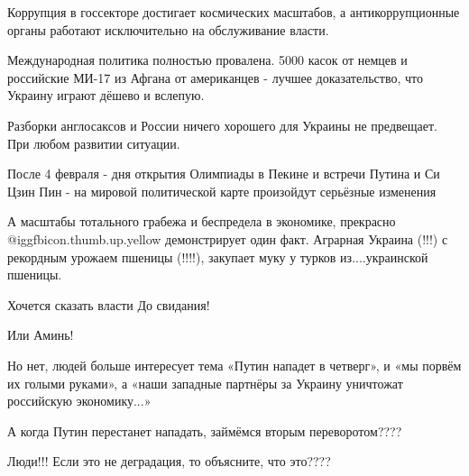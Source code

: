 Коррупция в госсекторе достигает космических масштабов, а антикоррупционные
органы работают исключительно на обслуживание власти. 

Международная политика полностью провалена. 5000 касок от немцев и российские
МИ-17 из Афгана от американцев - лучшее доказательство, что Украину играют
дёшево и вслепую. 

Разборки англосаксов и России ничего хорошего для Украины не предвещает. При
любом развитии ситуации. 

После 4 февраля - дня открытия Олимпиады в Пекине и встречи Путина и Си Цзин
Пин - на мировой политической карте произойдут серьёзные изменения 

А масштабы тотального грабежа и беспредела в экономике, прекрасно  @igg{fbicon.thumb.up.yellow} 
демонстрирует один факт. Аграрная Украина (!!!) с рекордным урожаем пшеницы
(!!!!), закупает муку у турков из....украинской пшеницы. 

Хочется сказать власти До свидания! 

Или Аминь! 

Но нет, людей больше интересует тема «Путин нападет в четверг», и «мы порвём их
голыми руками», а «наши западные партнёры за Украину уничтожат российскую
экономику...»

А когда Путин перестанет нападать, займёмся вторым переворотом????

Люди!!! Если это не деградация, то объясните, что это????
